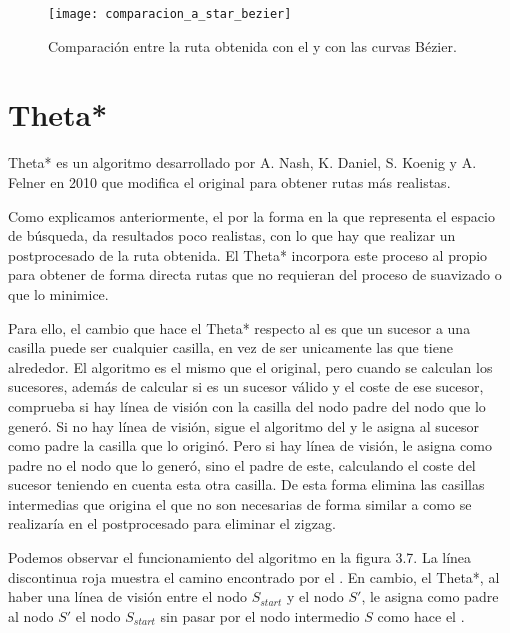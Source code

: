 \begin{figure}[!htpb]
    \centering
    \texttt{[image: comparacion\_a\_star\_bezier]}
    \caption[Comparativa de rutas con \Astar y con curvas Bézier]{Comparación entre la ruta obtenida con el \Astar y con las curvas Bézier.}
    \label{fig:basics AFM sketch}
\end{figure}

\newpage

\section{Theta*} \label{referenciaTheta}
Theta* es un algoritmo desarrollado por A. Nash, K. Daniel, S. Koenig y A. Felner \cite{thetaestrella, thetaestrellaweb} en 2010 que modifica el \Astar original para obtener rutas más realistas.

Como explicamos anteriormente, el \Astar por la forma en la que representa el espacio de búsqueda, da resultados poco realistas, con lo que hay que realizar un postprocesado de la ruta obtenida. El Theta* incorpora este proceso al propio \Astar para obtener de forma directa rutas que no requieran del proceso de suavizado o que lo minimice.

Para ello, el cambio que hace el Theta* respecto al \Astar es que un sucesor a una casilla puede ser cualquier casilla, en vez de ser unicamente las que tiene alrededor. El algoritmo es el mismo que el \Astar original, pero cuando se calculan los sucesores, además de calcular si es un sucesor válido y el coste de ese sucesor, comprueba si hay línea de visión con la casilla del nodo padre del nodo que lo generó. Si no hay línea de visión, sigue el algoritmo del \Astar y le asigna al sucesor como padre la casilla que lo originó. Pero si hay línea de visión, le asigna como padre no el nodo que lo generó, sino el padre de este, calculando el coste del sucesor teniendo en cuenta esta otra casilla. De esta forma elimina las casillas intermedias que origina el \Astar que no son necesarias de forma similar a como se realizaría en el postprocesado para eliminar el zigzag.

Podemos observar el funcionamiento del algoritmo en la figura 3.7. La línea discontinua roja muestra el camino encontrado por el \Astar. En cambio, el Theta*, al haber una línea de visión entre el nodo $S_{start}$ y el nodo $S'$, le asigna como padre al nodo $S'$ el nodo $S_{start}$ sin pasar por el nodo intermedio $S$ como hace el \Astar.

